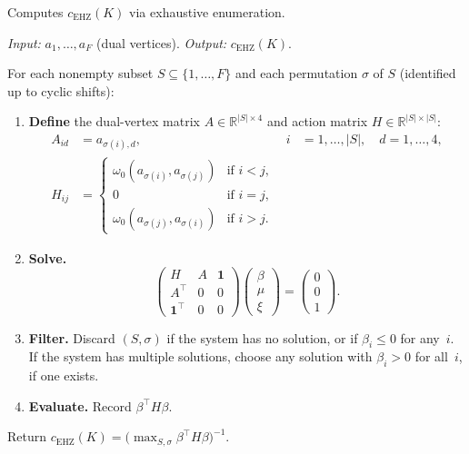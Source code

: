 \begin{algorithm}\label{alg:ehz}
Computes $c_{\mathrm{EHZ}}(K)$ via exhaustive enumeration.

\smallskip\noindent
\emph{Input:} $a_1, \ldots, a_F$ (dual vertices).
\quad
\emph{Output:} $c_{\mathrm{EHZ}}(K)$.

\smallskip\noindent
For each nonempty subset $S \subseteq \{1, \ldots, F\}$
and each permutation $\sigma$ of $S$
(identified up to cyclic shifts):

\begin{enumerate}
\item \textbf{Define}
  the dual-vertex matrix $A \in \mathbb{R}^{|S| \times 4}$
  and action matrix $H \in \mathbb{R}^{|S| \times |S|}$:
  \begin{align*}
    A_{id} &= a_{\sigma(i),d},
      & i &= 1, \ldots, |S|, \quad d = 1, \ldots, 4, \\
    H_{ij} &= \begin{cases}
      \omega_0(a_{\sigma(i)}, a_{\sigma(j)}) & \text{if } i < j, \\
      0 & \text{if } i = j, \\
      \omega_0(a_{\sigma(j)}, a_{\sigma(i)}) & \text{if } i > j.
    \end{cases}
  \end{align*}

\item \textbf{Solve.}
  \[
    \begin{pmatrix} H & A & \mathbf{1} \\ A^\top & 0 & 0 \\ \mathbf{1}^\top & 0 & 0 \end{pmatrix}
    \begin{pmatrix} \beta \\ \mu \\ \xi \end{pmatrix}
    = \begin{pmatrix} 0 \\ 0 \\ 1 \end{pmatrix}.
  \]

\item \textbf{Filter.}
  Discard $(S, \sigma)$ if the system has no solution, or
  if $\beta_i \leq 0$ for any~$i$.
  If the system has multiple solutions, choose any solution
  with $\beta_i > 0$ for all~$i$, if one exists.

\item \textbf{Evaluate.}
  Record $\beta^\top H \beta$.
\end{enumerate}

\noindent
Return
$c_{\mathrm{EHZ}}(K) = \bigl(\max_{S,\sigma} \beta^\top H \beta\bigr)^{-1}$.
\end{algorithm}


